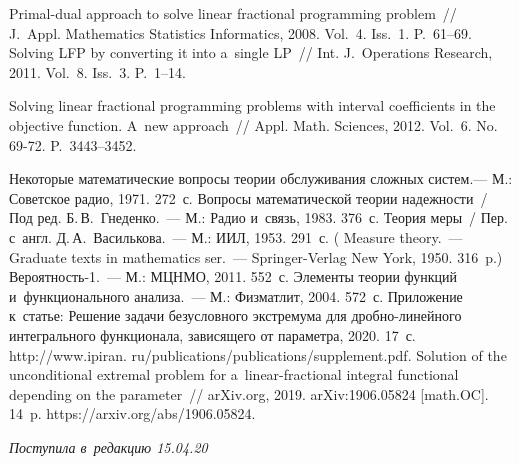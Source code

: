 \begin{multicols}{2}
{{\begin{thebibliography}{99}
   Primal-dual approach to solve linear fractional 
programming problem~// J.~Appl. Mathematics Statistics Informatics, 2008. Vol.~4. 
Iss.~1. P.~61--69.
   Solving LFP by converting it into a~single LP~// Int. 
J.~Operations Research, 2011. Vol.~8. Iss.~3. P.~1--14.

   Solving linear fractional programming problems with 
interval coefficients in the objective function. A~new approach~// Appl. Math. Sciences, 2012. 
Vol.~6. No.\,69-72.  
P.~3443--3452.

   Некоторые математические вопросы теории 
обслуживания сложных систем.--- М.: Советское радио, 1971. 272~с.
  Вопросы математической теории надежности~/ Под ред. Б.\,В.~Гнеденко.~--- М.: Радио 
и~связь, 1983. 376~с.
   Теория меры~/ Пер. с~англ. Д.\,А.~Василькова.~--- 
  М.: ИИЛ, 1953. 291~с.
  ( {Measure theory}.~--- Graduate texts in mathematics ser.~---
Springer-Verlag New York, 1950. 316~p.)
   Вероятность-1.~--- М.: МЦНМО, 2011. 552~с.
   Элементы теории функций и~функционального 
анализа.~--- М.: Физматлит, 2004. 572~с.
   Приложение к~\mbox{статье}: 
  Решение задачи безусловного 
экстремума для дроб\-но-ли\-ней\-но\-го интегрального функционала, зависящего от параметра, 
2020. 17~с. {\sf http://www.ipiran. ru/publications/publications/supplement.pdf}.
 Solution of the unconditional extremal problem for 
a~linear-fractional integral functional depending on the parameter~// 
arXiv.org, 2019. arXiv:1906.05824 
[math.OC]. 14~p. {\sf 
https://arxiv.org/abs/1906.05824}.
\end{thebibliography}

 }
 }

\end{multicols}

\vspace*{-3pt}

\hfill{\small\textit{Поступила в~редакцию 15.04.20}}

\vspace*{8pt}



